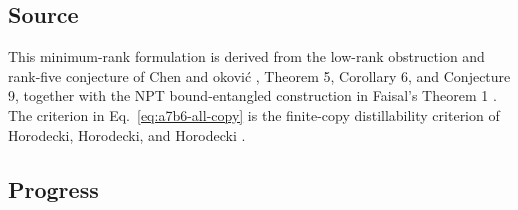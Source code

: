 \subsection*{Source}

This minimum-rank formulation is derived from the low-rank obstruction and
rank-five conjecture of Chen and \DJ okovi\'c
, Theorem 5, Corollary 6, and
Conjecture 9, together with the NPT bound-entangled construction in
Faisal's Theorem 1 .
The criterion in Eq.~\eqref{eq:a7b6-all-copy} is the finite-copy
distillability criterion of Horodecki, Horodecki, and Horodecki
.

\subsection*{Progress}

